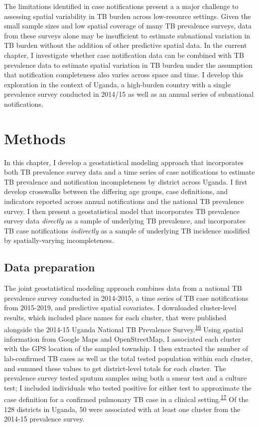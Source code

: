 \documentclass[
]{article}
\begin{document}
The limitations identified in case notifications present a a major challenge to assessing spatial variability in TB burden across low-resource settings. Given the small sample sizes and low spatial coverage of many TB prevalence surveys, data from these surveys alone may be insufficient to estimate subnational variation in TB burden without the addition of other predictive spatial data. In the current chapter, I investigate whether case notification data can be combined with TB prevalence data to estimate spatial variation in TB burden under the assumption that notification completeness also varies across space and time. I develop this exploration in the context of Uganda, a high-burden country with a single prevalence survey conducted in 2014/15 as well as an annual series of subnational notifications.

\hypertarget{methods}{%
\section{Methods}\label{methods}}

In this chapter, I develop a geostatistical modeling approach that incorporates both TB prevalence survey data and a time series of case notifications to estimate TB prevalence and notification incompleteness by district across Uganda. I first develop crosswalks between the differing age groups, case definitions, and indicators reported across annual notifications and the national TB prevalence survey. I then present a geostatistical model that incorporates TB prevalence survey data \emph{directly} as a sample of underlying TB prevalence, and incorporates TB case notifications \emph{indirectly} as a sample of underlying TB incidence modified by spatially-varying incompleteness.

\hypertarget{data-preparation}{%
\subsection{Data preparation}\label{data-preparation}}

The joint geostatistical modeling approach combines data from a national TB prevalence survey conducted in 2014-2015, a time series of TB case notifications from 2015-2019, and predictive spatial covariates. I downloaded cluster-level results, which included place names for each cluster, that were published alongside the 2014-15 Uganda National TB Prevalence Survey.\textsuperscript{\protect\hyperlink{ref-UgandaMinistryofHealth2015}{16}} Using spatial information from Google Maps and OpenStreetMap, I associated each cluster with the GPS location of the sampled township. I then extracted the number of lab-confirmed TB cases as well as the total tested population within each cluster, and summed these values to get district-level totals for each cluster. The prevalence survey tested sputum samples using both a smear test and a culture test; I included individuals who tested positive for either test to approximate the case definition for a confirmed pulmonary TB case in a clinical setting.\textsuperscript{\protect\hyperlink{ref-UgandaNationalTuberculosisandLeprosyProgramme2017}{17}} Of the 128 districts in Uganda, 50 were associated with at least one cluster from the 2014-15 prevalence survey.
\end{document}

